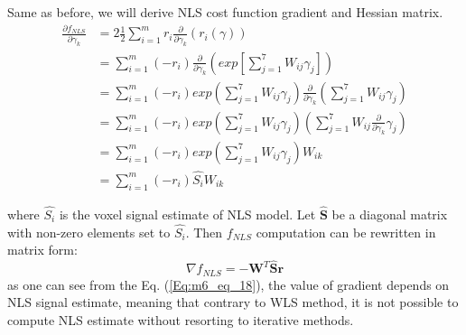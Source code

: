 Same as before, we will derive NLS cost function gradient and Hessian matrix. 
\begin{equation}
\begin{aligned}
\frac{\partial{f_{NLS}}}{\partial{\gamma_k}}&=2\frac{1}{2}\sum_{i=1}^{m}r_i\frac{\partial}{\partial{\gamma_k}}\left(r_i\left(\gamma\right)\right)\\
&=\sum_{i=1}^{m}(-r_i)\frac{\partial}{\partial{\gamma_k}}\left(exp\left[\sum_{j=1}^{7}W_{ij}\gamma_j\right]\right)\\
&=\sum_{i=1}^{m}(-r_i)exp\left(\sum_{j=1}^{7}W_{ij}\gamma_j\right)\frac{\partial}{\partial{\gamma_k}}\left(\sum_{j=1}^{7}W_{ij}\gamma_j\right)\\
&=\sum_{i=1}^{m}(-r_i)exp\left(\sum_{j=1}^{7}W_{ij}\gamma_j\right)\left(\sum_{j=1}^{7}W_{ij}\frac{\partial}{\partial{\gamma_k}}\gamma_j\right)\\
&=\sum_{i=1}^{m}(-r_i)exp\left(\sum_{j=1}^{7}W_{ij}\gamma_j\right)W_{ik}\\
&=\sum_{i=1}^{m}(-r_i)\hat{S_i}W_{ik}
\end{aligned}
\label{Eq:m6_eq_17}
\end{equation}

where $\hat{S_i}$ is the voxel signal estimate of NLS model. Let $\boldsymbol{\hat{S}}$ be a diagonal matrix with non-zero elements set to $\hat{S_i}$. Then $f_{NLS}$ computation can be rewritten in matrix form:
\begin{equation}
\nabla{f_{NLS}}=-\boldsymbol{W}^T\boldsymbol{\hat{S}}\boldsymbol{r}
\label{Eq:m6_eq_18}
\end{equation}
as one can see from the Eq. (\ref{Eq:m6_eq_18}), the value of gradient depends on NLS signal estimate, meaning that contrary to WLS method, it is not possible to compute NLS estimate without resorting to iterative methods.

